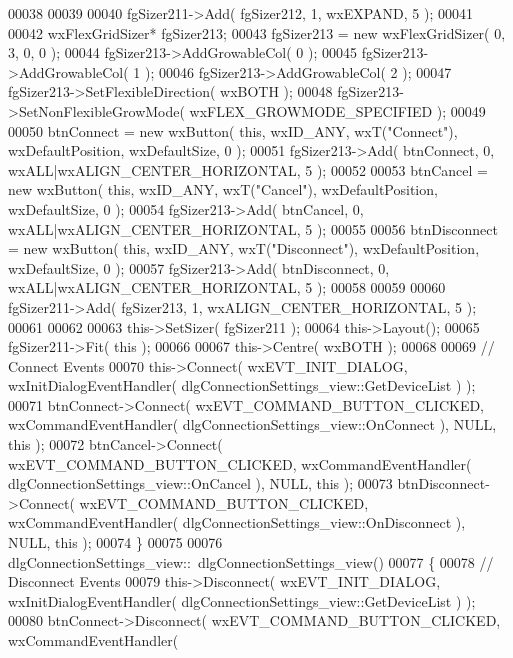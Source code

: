 \begin{DoxyCode}
00038     
00039     
00040     fgSizer211->Add( fgSizer212, 1, wxEXPAND, 5 );
00041     
00042     wxFlexGridSizer* fgSizer213;
00043     fgSizer213 = \textcolor{keyword}{new} wxFlexGridSizer( 0, 3, 0, 0 );
00044     fgSizer213->AddGrowableCol( 0 );
00045     fgSizer213->AddGrowableCol( 1 );
00046     fgSizer213->AddGrowableCol( 2 );
00047     fgSizer213->SetFlexibleDirection( wxBOTH );
00048     fgSizer213->SetNonFlexibleGrowMode( wxFLEX\_GROWMODE\_SPECIFIED );
00049     
00050     btnConnect = \textcolor{keyword}{new} wxButton( \textcolor{keyword}{this}, wxID\_ANY, wxT(\textcolor{stringliteral}{"Connect"}), wxDefaultPosition, wxDefaultSize, 0 );
00051     fgSizer213->Add( btnConnect, 0, wxALL|wxALIGN\_CENTER\_HORIZONTAL, 5 );
00052     
00053     btnCancel = \textcolor{keyword}{new} wxButton( \textcolor{keyword}{this}, wxID\_ANY, wxT(\textcolor{stringliteral}{"Cancel"}), wxDefaultPosition, wxDefaultSize, 0 );
00054     fgSizer213->Add( btnCancel, 0, wxALL|wxALIGN\_CENTER\_HORIZONTAL, 5 );
00055     
00056     btnDisconnect = \textcolor{keyword}{new} wxButton( \textcolor{keyword}{this}, wxID\_ANY, wxT(\textcolor{stringliteral}{"Disconnect"}), wxDefaultPosition, wxDefaultSize, 0 );
00057     fgSizer213->Add( btnDisconnect, 0, wxALL|wxALIGN\_CENTER\_HORIZONTAL, 5 );
00058     
00059     
00060     fgSizer211->Add( fgSizer213, 1, wxALIGN\_CENTER\_HORIZONTAL, 5 );
00061     
00062     
00063     this->SetSizer( fgSizer211 );
00064     this->Layout();
00065     fgSizer211->Fit( \textcolor{keyword}{this} );
00066     
00067     this->Centre( wxBOTH );
00068     
00069     \textcolor{comment}{// Connect Events}
00070     this->Connect( wxEVT\_INIT\_DIALOG, wxInitDialogEventHandler( 
      dlgConnectionSettings_view::GetDeviceList ) );
00071     btnConnect->Connect( wxEVT\_COMMAND\_BUTTON\_CLICKED, wxCommandEventHandler( 
      dlgConnectionSettings_view::OnConnect ), NULL, \textcolor{keyword}{this} );
00072     btnCancel->Connect( wxEVT\_COMMAND\_BUTTON\_CLICKED, wxCommandEventHandler( 
      dlgConnectionSettings_view::OnCancel ), NULL, \textcolor{keyword}{this} );
00073     btnDisconnect->Connect( wxEVT\_COMMAND\_BUTTON\_CLICKED, wxCommandEventHandler( 
      dlgConnectionSettings_view::OnDisconnect ), NULL, \textcolor{keyword}{this} );
00074 \}
00075 
00076 dlgConnectionSettings_view::~dlgConnectionSettings_view()
00077 \{
00078     \textcolor{comment}{// Disconnect Events}
00079     this->Disconnect( wxEVT\_INIT\_DIALOG, wxInitDialogEventHandler( 
      dlgConnectionSettings_view::GetDeviceList ) );
00080     btnConnect->Disconnect( wxEVT\_COMMAND\_BUTTON\_CLICKED, wxCommandEventHandler( 

\end{DoxyCode}
